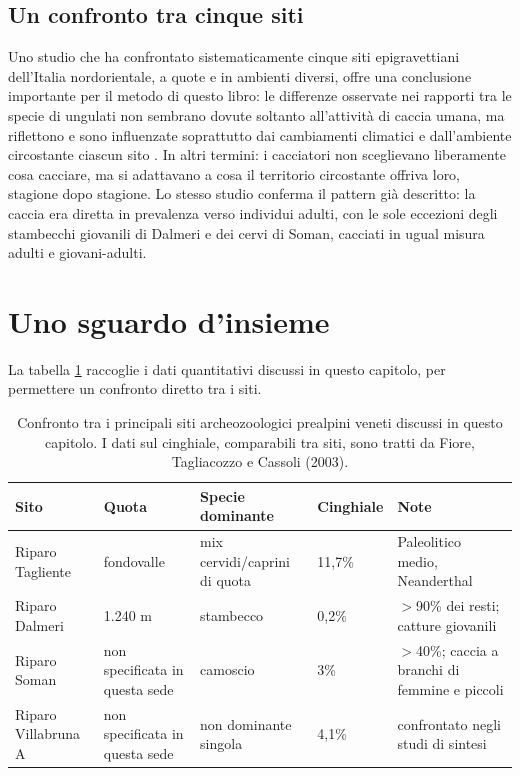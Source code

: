 \subsection{Un confronto tra cinque siti}

Uno studio che ha confrontato sistematicamente cinque siti epigravettiani dell'Italia nordorientale, a quote e in ambienti diversi, offre una conclusione importante per il metodo di questo libro: le differenze osservate nei rapporti tra le specie di ungulati non sembrano dovute soltanto all'attività di caccia umana, ma riflettono e sono influenzate soprattutto dai cambiamenti climatici e dall'ambiente circostante ciascun sito \citep{fioreetal2003}. In altri termini: i cacciatori non sceglievano liberamente cosa cacciare, ma si adattavano a cosa il territorio circostante offriva loro, stagione dopo stagione. Lo stesso studio conferma il pattern già descritto: la caccia era diretta in prevalenza verso individui adulti, con le sole eccezioni degli stambecchi giovanili di Dalmeri e dei cervi di Soman, cacciati in ugual misura adulti e giovani-adulti.

\section{Uno sguardo d'insieme}

La tabella \ref{tab:fauna_siti} raccoglie i dati quantitativi discussi in questo capitolo, per permettere un confronto diretto tra i siti.

\begin{table}[htbp]
\centering
\small
\begin{tabular}{@{}p{2.6cm}p{2.0cm}p{2.6cm}p{1.4cm}p{2.4cm}@{}}
\toprule
\textbf{Sito} & \textbf{Quota} & \textbf{Specie dominante} & \textbf{Cinghiale} & \textbf{Note} \\
\midrule
Riparo Tagliente & fondovalle & mix cervidi/caprini di quota & 11,7\% & Paleolitico medio, Neanderthal \\
Riparo Dalmeri & 1.240 m & stambecco & 0,2\% & $>$90\% dei resti; catture giovanili \\
Riparo Soman & non specificata in questa sede & camoscio & 3\% & $>$40\%; caccia a branchi di femmine e piccoli \\
Riparo Villabruna A & non specificata in questa sede & non dominante singola & 4,1\% & confrontato negli studi di sintesi \\
\bottomrule
\end{tabular}
\caption{Confronto tra i principali siti archeozoologici prealpini veneti discussi in questo capitolo. I dati sul cinghiale, comparabili tra siti, sono tratti da Fiore, Tagliacozzo e Cassoli (2003).}
\label{tab:fauna_siti}
\end{table}

